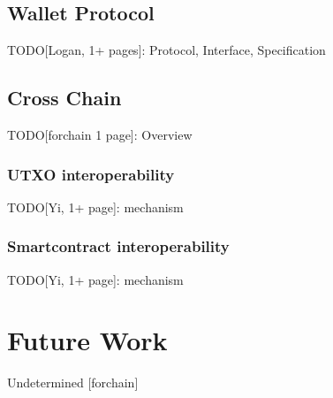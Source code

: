 \documentclass[a4paper,11pt]{article}
\begin{document}
\subsection{Wallet Protocol}
TODO[Logan, 1+ pages]: Protocol, Interface, Specification

\subsection{Cross Chain}
TODO[forchain 1 page]: Overview

\subsubsection{UTXO interoperability}
TODO[Yi, 1+ page]:  mechanism

\subsubsection{Smartcontract interoperability}
TODO[Yi, 1+ page]: mechanism

\section{Future Work}
Undetermined [forchain] 



\clearpage



%
%


\end{document}
